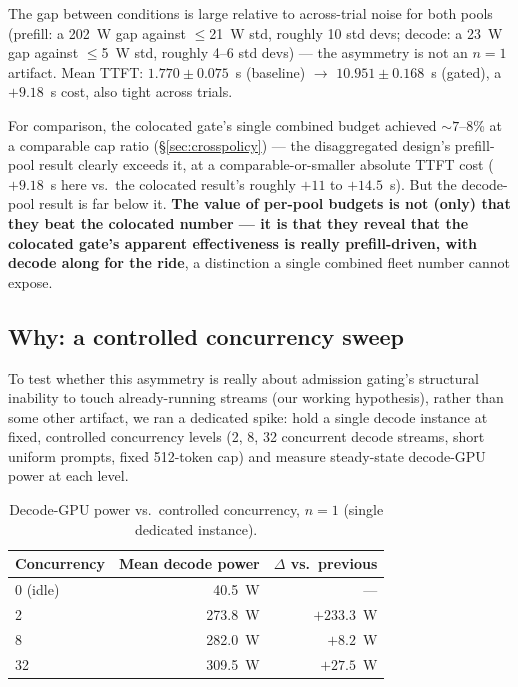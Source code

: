 \documentclass[sigconf,review,anonymous]{acmart}
\begin{document}
The gap between conditions is large relative to across-trial noise for both pools (prefill: a
202~W gap against $\leq$21~W std, roughly 10 std devs; decode: a 23~W gap against $\leq$5~W
std, roughly 4--6 std devs) --- the asymmetry is not an $n{=}1$ artifact. Mean TTFT:
$1.770{\pm}0.075$~s (baseline) $\rightarrow$ $10.951{\pm}0.168$~s (gated), a $+9.18$~s cost,
also tight across trials.

For comparison, the colocated gate's single combined budget achieved ${\sim}7$--8\% at a
comparable cap ratio (\S\ref{sec:crosspolicy}) --- the disaggregated design's prefill-pool
result clearly exceeds it, at a comparable-or-smaller absolute TTFT cost ($+9.18$~s here
vs.\ the colocated result's roughly $+11$ to $+14.5$~s). But the decode-pool result is far
below it. \textbf{The value of per-pool budgets is not (only) that they beat the colocated
number --- it is that they reveal that the colocated gate's apparent effectiveness is really
prefill-driven, with decode along for the ride}, a distinction a single combined fleet number
cannot expose.

\subsection{Why: a controlled concurrency sweep}
\label{sec:concurrency}

To test whether this asymmetry is really about admission gating's structural inability to
touch already-running streams (our working hypothesis), rather than some other artifact, we
ran a dedicated spike: hold a single decode instance at fixed, controlled concurrency levels
(2, 8, 32 concurrent decode streams, short uniform prompts, fixed 512-token cap) and measure
steady-state decode-GPU power at each level.

\begin{table}[t]
  \caption{Decode-GPU power vs.\ controlled concurrency, $n{=}1$ (single dedicated instance).}
  \label{tab:concurrency}
  \footnotesize
  \begin{tabular}{@{}lrr@{}}
    \toprule
    Concurrency & Mean decode power & $\Delta$ vs.\ previous \\
    \midrule
    0 (idle) & 40.5~W  & --- \\
    2        & 273.8~W & $+233.3$~W \\
    8        & 282.0~W & $+8.2$~W \\
    32       & 309.5~W & $+27.5$~W \\
    \bottomrule
  \end{tabular}
\end{table}
\end{document}
